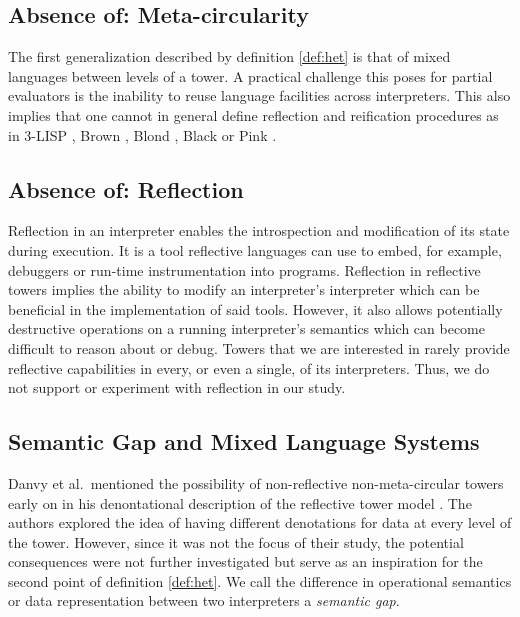 \documentclass[a4paper,12pt,twoside,openright]{report}
\theoremstyle{definition}
\begin{document}
\subsection{Absence of: Meta-circularity}
The first generalization described by definition \ref{def:het} is that of mixed languages between levels of a tower. A practical challenge this poses for partial evaluators is the inability to reuse language facilities across interpreters. This also implies that one cannot in general define reflection and reification procedures as in 3-LISP \cite{smith1984reflection}, Brown \cite{wand1988mystery}, Blond \cite{danvy1988intensions}, Black \cite{asai1996duplication} or Pink \cite{amin2017collapsing}.

\subsection{Absence of: Reflection}
Reflection in an interpreter enables the introspection and modification of its state during execution. It is a tool reflective languages can use to embed, for example, debuggers or run-time instrumentation into programs. Reflection in reflective towers implies the ability to modify an interpreter's interpreter which can be beneficial in the implementation of said tools. However, it also allows potentially destructive operations on a running interpreter's semantics which can become difficult to reason about or debug. Towers that we are interested in rarely provide reflective capabilities in every, or even a single, of its interpreters. Thus, we do not support or experiment with reflection in our study.

\subsection{Semantic Gap and Mixed Language Systems}
Danvy et al.~mentioned the possibility of non-reflective non-meta-circular towers early on in his denontational description of the reflective tower model \cite{danvy1988intensions}. The authors explored the idea of having different denotations for data at every level of the tower. However, since it was not the focus of their study, the potential consequences were not further investigated but serve as an inspiration for the second point of definition \ref{def:het}. We call the difference in operational semantics or data representation between two interpreters a \textit{semantic gap}.
\end{document}
